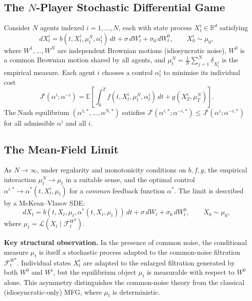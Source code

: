 \subsection{The $N$-Player Stochastic Differential Game}

Consider $N$ agents indexed $i = 1, \ldots, N$, each with state process
$X_t^i \in \mathbb{R}^d$ satisfying
\begin{equation}
    dX_t^i = b(t, X_t^i, \mu_t^N, \alpha_t^i)\, dt + \sigma\, dW_t^i + \sigma_0\,
    dW_t^0, \qquad X_0^i \sim \mu_0,
    \label{eq:N-agent-sde}
\end{equation}
where $W^1, \ldots, W^N$ are independent Brownian motions (idiosyncratic noise),
$W^0$ is a common Brownian motion shared by all agents, and
$\mu_t^N = \frac{1}{N}\sum_{j=1}^N \delta_{X_t^j}$ is the empirical measure.
Each agent $i$ chooses a control $\alpha_t^i$ to minimise its individual cost
\[
    J^i(\alpha^i; \alpha^{-i}) = \mathbb{E}\left[ \int_0^T f(t, X_t^i, \mu_t^N,
    \alpha_t^i)\, dt + g(X_T^i, \mu_T^N) \right].
\]
The Nash equilibrium $(\alpha^{1,*}, \ldots, \alpha^{N,*})$ satisfies
$J^i(\alpha^{i,*}; \alpha^{-i,*}) \le J^i(\alpha^i; \alpha^{-i,*})$ for all
admissible $\alpha^i$ and all $i$.

\subsection{The Mean-Field Limit}

As $N \to \infty$, under regularity and monotonicity conditions on $b, f, g$,
the empirical interaction $\mu_t^N \to \mu_t$ in a suitable sense, and the
optimal control $\alpha^{i,*} \to \alpha^*(t, X_t^i, \mu_t)$ for a \emph{common}
feedback function $\alpha^*$. The limit is described by a McKean--Vlasov SDE:
\begin{equation}
    dX_t = b(t, X_t, \mu_t, \alpha^*(t, X_t, \mu_t))\, dt + \sigma\, dW_t +
    \sigma_0\, dW_t^0, \qquad X_0 \sim \mu_0,
    \label{eq:mckean-vlasov}
\end{equation}
where $\mu_t = \mathcal{L}(X_t \mid \mathcal{F}_t^{W^0})$.

\textbf{Key structural observation.} In the presence of common noise, the conditional
measure $\mu_t$ is itself a stochastic process adapted to the common-noise
filtration $\mathcal{F}_t^{W^0}$. Individual states $X_t^i$ are adapted to the
enlarged filtration generated by both $W^0$ and $W^i$, but the equilibrium object
$\mu_t$ is measurable with respect to $W^0$ alone. This asymmetry distinguishes the
common-noise theory from the classical (idiosyncratic-only) MFG, where $\mu_t$ is
deterministic.

